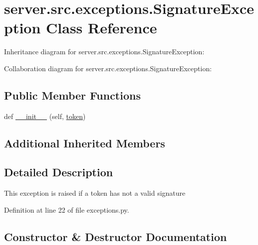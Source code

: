 \hypertarget{classserver_1_1src_1_1exceptions_1_1_signature_exception}{}\section{server.\+src.\+exceptions.\+Signature\+Exception Class Reference}
\label{classserver_1_1src_1_1exceptions_1_1_signature_exception}


Inheritance diagram for server.\+src.\+exceptions.\+Signature\+Exception\+:


Collaboration diagram for server.\+src.\+exceptions.\+Signature\+Exception\+:
\subsection*{Public Member Functions}
\begin{DoxyCompactItemize}
\item 
def \hyperlink{classserver_1_1src_1_1exceptions_1_1_signature_exception_a3fae4709073170dabacdc6f190faca75}{\+\_\+\+\_\+init\+\_\+\+\_\+} (self, \hyperlink{classserver_1_1src_1_1exceptions_1_1_invalid_token_exception_a55c9f26dd8ec500cd9f49be460f45379}{token})
\end{DoxyCompactItemize}
\subsection*{Additional Inherited Members}


\subsection{Detailed Description}
\begin{DoxyVerb}This exception is raised if a token has not a valid signature\end{DoxyVerb}
 

Definition at line 22 of file exceptions.\+py.



\subsection{Constructor \& Destructor Documentation}
